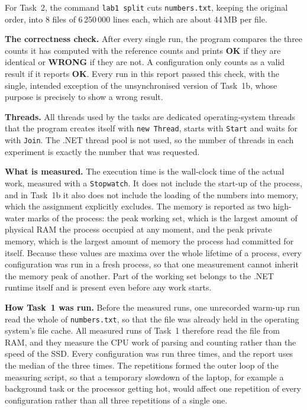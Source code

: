 \documentclass[11pt,a4paper]{article}
\newcommand{\WRONG}{\textcolor{wrong}{\textbf{WRONG}}}
\newcommand{\OK}{\textbf{OK}}
\begin{document}
For Task~2, the command \texttt{lab1 split} cuts \texttt{numbers.txt}, keeping the original order,
into 8 files of 6\,250\,000 lines each, which are about 44\,MB per file.

\textbf{The correctness check.} After every single run, the program compares the three counts it has
computed with the reference counts and prints \OK{} if they are identical or \WRONG{} if they are
not. A configuration only counts as a valid result if it reports \OK. Every run in this report
passed this check, with the single, intended exception of the unsynchronised version of Task~1b,
whose purpose is precisely to show a wrong result.

\textbf{Threads.} All threads used by the tasks are dedicated operating-system threads that the
program creates itself with \texttt{new Thread}, starts with \texttt{Start} and waits for with
\texttt{Join}. The .NET thread pool is not used, so the number of threads in each experiment is
exactly the number that was requested.

\textbf{What is measured.} The execution time is the wall-clock time of the actual work, measured
with a \texttt{Stopwatch}. It does not include the start-up of the process, and in Task~1b it also
does not include the loading of the numbers into memory, which the assignment explicitly excludes.
The memory is reported as two high-water marks of the process: the peak working set, which is the
largest amount of physical RAM the process occupied at any moment, and the peak private memory,
which is the largest amount of memory the process had committed for itself. Because these values
are maxima over the whole lifetime of a process, every configuration was run in a fresh process, so
that one measurement cannot inherit the memory peak of another. Part of the working set belongs to
the .NET runtime itself and is present even before any work starts.

\textbf{How Task~1 was run.} Before the measured runs, one unrecorded warm-up run read the whole of
\texttt{numbers.txt}, so that the file was already held in the operating system's file cache. All
measured runs of Task~1 therefore read the file from RAM, and they measure the CPU work of parsing
and counting rather than the speed of the SSD. Every configuration was run three times, and the
report uses the median of the three times. The repetitions formed the outer loop of the measuring
script, so that a temporary slowdown of the laptop, for example a background task or the processor
getting hot, would affect one repetition of every configuration rather than all three repetitions of
a single one.
\end{document}
